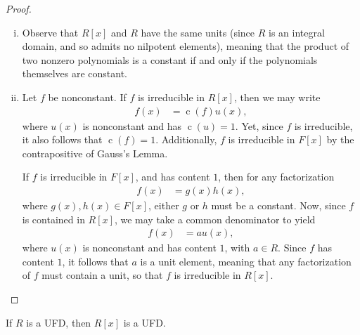 \documentclass[10pt]{mypackage}
\begin{document}
\begin{proof}\hfill
  \begin{enumerate}[(i)]
    \item Observe that $R[x]$ and $R$ have the same units (since $R$ is an integral domain, and so admits no nilpotent elements), meaning that the product of two nonzero polynomials is a constant if and only if the polynomials themselves are constant.
    \item Let $f$ be nonconstant. If $f$ is irreducible in $R[x]$, then we may write
      \begin{align*}
        f(x) &= \operatorname{c}\left( f \right)u(x),
      \end{align*}
      where $u(x)$ is nonconstant and has $\operatorname{c}(u) = 1$. Yet, since $f$ is irreducible, it also follows that $\operatorname{c}(f) = 1$. Additionally, $f$ is irreducible in $F[x]$ by the contrapositive of Gauss's Lemma.\newline

      If $f$ is irreducible in $F[x]$, and has content $1$, then for any factorization
      \begin{align*}
        f(x) &= g(x)h(x),
      \end{align*}
      where $g(x),h(x)\in F[x]$, either $g$ or $h$ must be a constant. Now, since $f$ is contained in $R[x]$, we may take a common denominator to yield
      \begin{align*}
        f(x) &= a u(x),
      \end{align*}
      where $u(x)$ is nonconstant and has content $1$, with $a\in R$. Since $f$ has content $1$, it follows that $a$ is a unit element, meaning that any factorization of $f$ must contain a unit, so that $f$ is irreducible in $R[x]$.
  \end{enumerate}
\end{proof}
\begin{theorem}
  If $R$ is a UFD, then $R[x]$ is a UFD.
\end{theorem}
\end{document}
